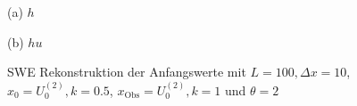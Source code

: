 \begin{figure}[H]
\begin{minipage}[b]{0.49\linewidth}
\centering

\caption*{(a) $h$}
\end{minipage}
\begin{minipage}[b]{0.49\linewidth}
\centering

\caption*{(b) $hu$}
\end{minipage}
\caption{SWE Rekonstruktion der Anfangswerte mit $L=100,\Delta x=10$, $x_0=U_0^{(2)},k=0.5$, $x_{\text{Obs}} = U_0^{(2)}, k=1$ und $\theta=2$}
\label{fig:sweOptInitValues}
\end{figure}

